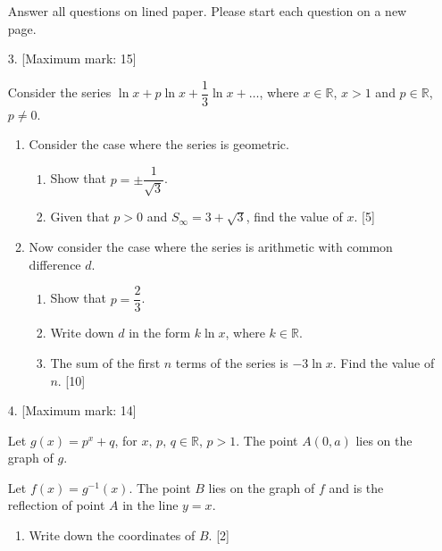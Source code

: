 \documentclass[12pt, twoside]{article}
\begin{document}
\begin{enumerate}[itemsep=0.15cm]
\newpage

\noindent Answer all questions on lined paper.
Please start each question on a new page.

\medskip

\item[3.] [Maximum mark: 15]

Consider the series $\ln x + p \ln x + \dfrac{1}{3} \ln x + \ldots$,
where $x \in \mathbb{R}$, $x > 1$ and $p \in \mathbb{R}$, $p \neq 0$.

\begin{enumerate}[itemsep=0.2cm]
  \item Consider the case where the series is geometric.
  \begin{enumerate}[itemsep=0.1cm, label=(\roman*)]
    \item Show that $p = \pm \dfrac{1}{\sqrt{3}}$.
    \item Given that $p > 0$ and $S_{\infty} = 3 + \sqrt{3}$,
    find the value of $x$. \hfill [5]
  \end{enumerate}

  \item Now consider the case where the series is arithmetic
  with common difference $d$.
  \begin{enumerate}[itemsep=0.1cm, label=(\roman*)]
    \item Show that $p = \dfrac{2}{3}$.
    \item Write down $d$ in the form $k \ln x$, where
    $k \in \mathbb{R}$.
    \item The sum of the first $n$ terms of the series is
    $-3 \ln x$. Find the value of $n$. \hfill [10]
  \end{enumerate}
\end{enumerate}

\bigskip

\item[4.] [Maximum mark: 14]

Let $g(x) = p^x + q$, for $x, \, p, \, q \in \mathbb{R}$, $p > 1$.
The point $A(0, a)$ lies on the graph of $g$.

Let $f(x) = g^{-1}(x)$. The point $B$ lies on the graph
of $f$ and is the reflection of point $A$ in the line $y = x$.

\begin{enumerate}[itemsep=0.15cm]
  \item Write down the coordinates of $B$. \hfill [2]
\end{enumerate}


\end{enumerate}
\end{document}
